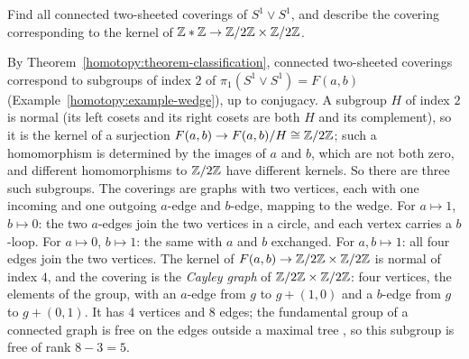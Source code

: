 \begin{exercise}\label{homotopy:exercise-free-group-covering}
Find all connected two-sheeted coverings of $S^1 \vee S^1$, and describe the covering corresponding to the kernel of $\mathbb{Z} * \mathbb{Z} \to \mathbb{Z}/2\mathbb{Z} \times \mathbb{Z}/2\mathbb{Z}$.
\end{exercise}

\begin{solution}
By Theorem~\ref{homotopy:theorem-classification}, connected two-sheeted coverings correspond to subgroups of index $2$ of $\pi_1(S^1 \vee S^1) = F(a, b)$ (Example~\ref{homotopy:example-wedge}), up to
conjugacy. A subgroup $H$ of index $2$ is normal (its left cosets and its right cosets are both $H$ and its complement), so it is the kernel of a surjection
$F(a, b) \to F(a, b)/H \cong \mathbb{Z}/2\mathbb{Z}$; such a homomorphism is determined by the images of $a$ and $b$, which are not both zero, and different homomorphisms to $\mathbb{Z}/2\mathbb{Z}$ have different kernels. So there are
three such subgroups. The coverings are graphs with two vertices, each with one incoming and one outgoing $a$-edge and $b$-edge, mapping to the wedge. For $a \mapsto 1$, $b \mapsto 0$: the two $a$-edges join the two
vertices in a circle, and each vertex carries a $b$-loop. For $a \mapsto 0$, $b \mapsto 1$: the same with $a$ and $b$ exchanged. For $a, b \mapsto 1$: all four edges join the two vertices. The kernel of
$F(a, b) \to \mathbb{Z}/2\mathbb{Z} \times \mathbb{Z}/2\mathbb{Z}$ is normal of index $4$, and the covering is the \emph{Cayley graph} of $\mathbb{Z}/2\mathbb{Z} \times \mathbb{Z}/2\mathbb{Z}$: four vertices, the elements of the group, with an $a$-edge from $g$ to
$g + (1, 0)$ and a $b$-edge from $g$ to $g + (0, 1)$. It has $4$ vertices and $8$ edges; the fundamental group of a connected graph is free on the edges outside a maximal tree \cite[Proposition~1A.2]{hatcher-at}, so this subgroup is free of rank
$8 - 3 = 5$.
\end{solution}
